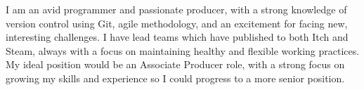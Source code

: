 

\begin{cvparagraph}
    I am an avid programmer and passionate producer, with a strong knowledge of version control using Git, agile methodology, and an excitement for facing new, interesting challenges. I have lead teams which have published to both Itch and Steam, always with a focus on maintaining healthy and flexible working practices. My ideal position would be an Associate Producer role, with a strong focus on growing my skills and experience so I could progress to a more senior position.
    
\end{cvparagraph}
